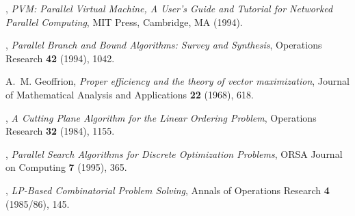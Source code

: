 \begin{thebibliography}{9}



,
{\em PVM: Parallel Virtual Machine, A User's Guide and Tutorial for
Networked Parallel Computing},
MIT Press, Cambridge, MA (1994).

,
{\em Parallel Branch and Bound Algorithms: Survey and Synthesis},
Operations Research {\bf 42} (1994), 1042. 


{\sc A.~M. Geoffrion},
{\em Proper efficiency and the theory of vector maximization},
Journal of Mathematical Analysis and Applications \textbf{22} (1968), 618.

, {\em
A Cutting Plane Algorithm for the Linear Ordering Problem}, Operations
Research {\bf 32} (1984), 1155.

, {\em Parallel Search
Algorithms for Discrete Optimization Problems}, ORSA Journal on
Computing {\bf 7} (1995), 365.



, 
{\em LP-Based Combinatorial Problem Solving},
Annals of Operations Research {\bf 4} (1985/86), 145.



\end{thebibliography}
